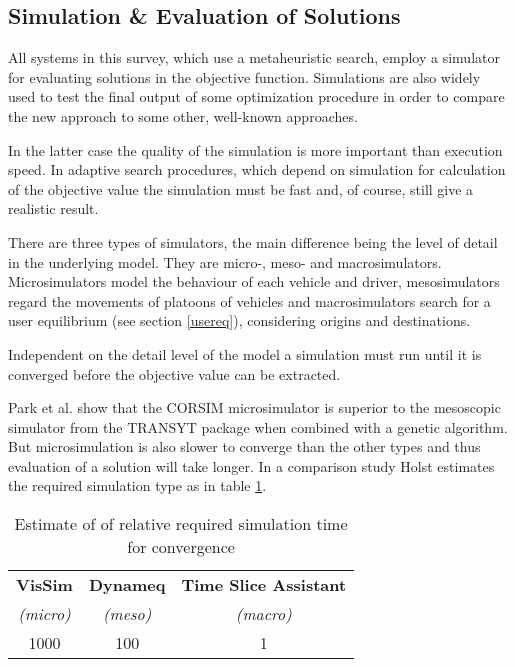 \label{adaptive_cooperation}

\subsection{Simulation \& Evaluation of Solutions}
All systems in this survey, which use a metaheuristic search, employ a simulator for evaluating solutions in the objective function. Simulations are also widely used to test the final output of some optimization procedure in order to compare the new approach to some other, well-known approaches. 

In the latter case the quality of the simulation is more important than execution speed. In adaptive search procedures, which depend on simulation for calculation of the objective value the simulation must be fast and, of course, still give a realistic result. 

There are three types of simulators, the main difference being the level of detail in the underlying model. They are micro-, meso- and macrosimulators. Microsimulators model the behaviour of each vehicle and driver, mesosimulators regard the movements of platoons of vehicles and macrosimulators search for a user equilibrium (see section \ref{usereq}), considering origins and destinations.

Independent on the detail level of the model a simulation must run until it is converged before the objective value can be extracted. 

Park et al. \cite{4} show that the CORSIM microsimulator is superior to the mesoscopic simulator from the TRANSYT package when combined with a genetic algorithm. But microsimulation is also slower to converge than the other types and thus evaluation of a solution will take longer. In a comparison study \cite{simcompare} Holst estimates the required simulation type as in table \ref{tab:convergespeed}.

\begin{table}[!h]
\begin{center}
\begin{tabular}{c|c|c}
\textbf{VisSim} & \textbf{Dynameq} & \textbf{Time Slice Assistant} \\
\textit{(micro)} & \textit{(meso)} & \textit{(macro)} \\ \hline
1000 & 100 & 1
\end{tabular}
\end{center}
\label{tab:convergespeed}
\caption{Estimate of of relative required simulation time for convergence}
\end{table}

